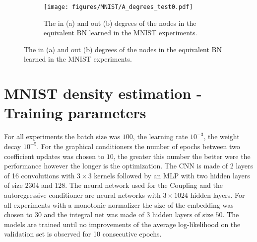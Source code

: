 \begin{figure}
\begin{minipage}[h]{.49\textwidth}
\begin{figure}[H]
    \centering
    \texttt{[image: figures/MNIST/A\_degrees\_test0.pdf]}
    \caption{The in (a) and out (b) degrees of the nodes in the equivalent BN learned in the MNIST experiments.} \label{fig:in-out-degrees}
\end{figure}


\end{minipage}
\end{figure}

\section{MNIST density estimation - Training parameters}
For all experiments the batch size was $100$, the learning rate $10^{-3}$, the weight decay $10^{-5}$. For the graphical conditioners the number of epochs between two coefficient updates was chosen to $10$, the greater this number the better were the performance however the longer is the optimization. The CNN is made of 2 layers of 16 convolutions with $3\times 3$ kernels followed by an MLP with two hidden layers of size $2304$ and $128$. The neural network used for the Coupling and the autoregressive conditioner are neural networks with $3 \times 1024$ hidden layers. For all experiments with a monotonic normalizer the size of the embedding was chosen to $30$ and the integral net was made of 3 hidden layers of size $50$.
The models are trained until no improvements of the average log-likelihood on the validation set is observed for 10 consecutive epochs.
